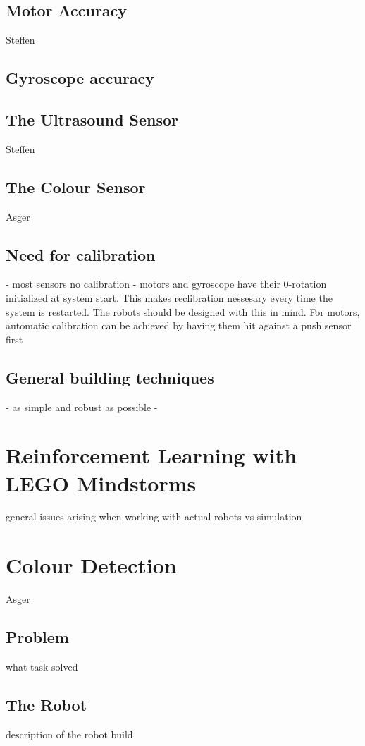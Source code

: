 \documentclass[11pt, a4paper]{article}
\begin{document}
\subsection{Motor Accuracy}
Steffen
\subsection{Gyroscope accuracy}

\subsection{The Ultrasound Sensor}
Steffen
\subsection{The Colour Sensor}
Asger

\subsection{Need for calibration}
- most sensors no calibration
- motors and gyroscope have their 0-rotation initialized at system start. This makes reclibration nessesary every time the system is restarted. The robots should be designed with this in mind. For motors, automatic calibration can be achieved by having them hit against a push sensor first

\subsection{General building techniques}
- as simple and robust as possible
- 

\section{Reinforcement Learning with LEGO Mindstorms}
general issues arising when working with actual robots vs simulation

\section{Colour Detection}
Asger
\subsection{Problem}
what task solved
\subsection{The Robot}
description of the robot build
\end{document}
